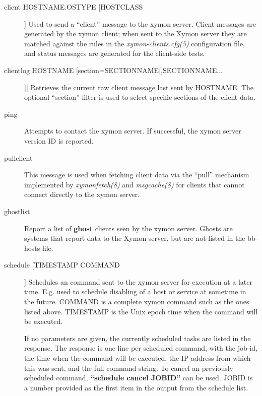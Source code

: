 \begin{description}
 

\item[client HOSTNAME.OSTYPE [HOSTCLASS]] Used to send a ``client''
  message to the xymon server. Client messages are generated by the
  xymon client; when sent to the Xymon server they are matched
  against the rules in the \emph{xymon-clients.cfg(5)} configuration
  file, and status messages are generated for the client-side tests. 


 

\item[clientlog HOSTNAME [section=SECTIONNAME[,SECTIONNAME...]]]
  Retrieves the current raw client message last sent by HOSTNAME. The
  optional ``section'' filter is used to select specific sections of
  the client data. 



\item[ping] Attempts to contact the xymon server. If successful, the
  xymon server version ID is reported. 


 

\item[pullclient] This message is used when fetching client data via
  the ``pull'' mechanism implemented by \emph{xymonfetch(8)} and
  \emph{msgcache(8)} for clients that cannot connect directly to the
  xymon server. 



\item[ghostlist] Report a list of \textbf{ghost} clients seen by the
  xymon server. Ghosts are systems that report data to the Xymon
  server, but are not listed in the bb-hosts file. 

 

\item[schedule [TIMESTAMP COMMAND]] Schedules an command sent to the
  xymon server for execution at a later time. E.g. used to schedule
  disabling of a host or service at sometime in the future. COMMAND is
  a complete xymon command such as the ones listed above. TIMESTAMP
  is the Unix epoch time when the command will be executed.  

 If no parameters are given, the currently scheduled tasks are listed
 in the response. The response is one line per scheduled command, with
 the job-id, the time when the command will be executed, the IP
 address from which this was sent, and the full command string.   To
 cancel an previously scheduled command, \textbf{``schedule cancel
 JOBID''} can be used. JOBID is a number provided as the first item in
 the output from the schedule list. 


 


\end{description}

